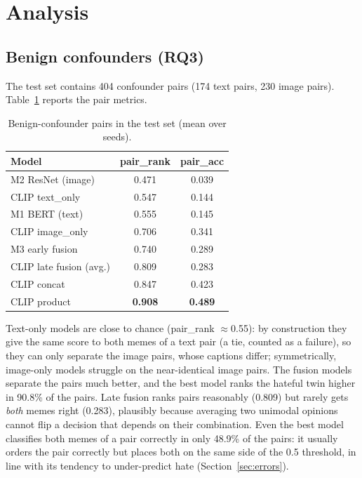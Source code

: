 \documentclass[conference]{IEEEtran}
\newcommand{\best}[1]{\textbf{#1}}
\begin{document}
\section{Analysis}
\subsection{Benign confounders (RQ3)}
The test set contains 404 confounder pairs (174 text pairs, 230 image pairs). Table~\ref{tab:conf} reports the pair
metrics.

\begin{table}[t]
\centering
\caption{Benign-confounder pairs in the test set (mean over seeds).}
\label{tab:conf}
\begin{tabular}{lcc}
\toprule
Model & pair\_rank & pair\_acc \\
\midrule
M2 ResNet (image) & 0.471 & 0.039 \\
CLIP text\_only & 0.547 & 0.144 \\
M1 BERT (text) & 0.555 & 0.145 \\
CLIP image\_only & 0.706 & 0.341 \\
M3 early fusion & 0.740 & 0.289 \\
CLIP late fusion (avg.) & 0.809 & 0.283 \\
CLIP concat & 0.847 & 0.423 \\
CLIP product & \best{0.908} & \best{0.489} \\
\bottomrule
\end{tabular}
\end{table}

Text-only models are close to chance (pair\_rank $\approx$0.55): by construction they give the same score to both
memes of a text pair (a tie, counted as a failure), so they can only separate the image pairs, whose captions differ;
symmetrically, image-only models struggle on the near-identical image pairs. The fusion models separate the pairs
much better, and the best model ranks the hateful twin higher in 90.8\% of the pairs. Late fusion ranks pairs
reasonably (0.809) but rarely gets \emph{both} memes right (0.283), plausibly because averaging two unimodal opinions
cannot flip a decision that depends on their combination. Even the best model classifies both memes of a pair correctly in only
48.9\% of the pairs: it usually orders the pair correctly but places both on the same side of the 0.5 threshold,
in line with its tendency to under-predict hate (Section~\ref{sec:errors}).
\end{document}
